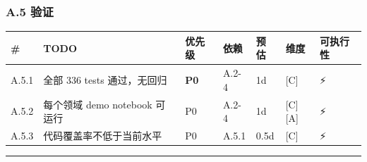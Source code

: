 \documentclass[
  12pt,
]{ctexart}
\begin{document}
\subsubsection{A.5 验证}\label{a.5-ux9a8cux8bc1}

\begin{longtable}[]{@{}
  >{\raggedright\arraybackslash}p{}
  >{\raggedright\arraybackslash}p{}
  >{\raggedright\arraybackslash}p{}
  >{\raggedright\arraybackslash}p{}
  >{\raggedright\arraybackslash}p{}
  >{\raggedright\arraybackslash}p{}
  >{\raggedright\arraybackslash}p{}@{}}
\toprule\noalign{}
\begin{minipage}[b]{\linewidth}\raggedright
\#
\end{minipage} & \begin{minipage}[b]{\linewidth}\raggedright
TODO
\end{minipage} & \begin{minipage}[b]{\linewidth}\raggedright
优先级
\end{minipage} & \begin{minipage}[b]{\linewidth}\raggedright
依赖
\end{minipage} & \begin{minipage}[b]{\linewidth}\raggedright
预估
\end{minipage} & \begin{minipage}[b]{\linewidth}\raggedright
维度
\end{minipage} & \begin{minipage}[b]{\linewidth}\raggedright
可执行性
\end{minipage} \\
\midrule\noalign{}
\endhead
\bottomrule\noalign{}
\endlastfoot
A.5.1 & 全部 336 tests 通过，无回归 & \textbf{P0} & A.2-4 & 1d & {[}C{]}
& ⚡ \\
A.5.2 & 每个领域 demo notebook 可运行 & P0 & A.2-4 & 1d & {[}C{]}{[}A{]}
& ⚡ \\
A.5.3 & 代码覆盖率不低于当前水平 & P0 & A.5.1 & 0.5d & {[}C{]} & ⚡ \\
\end{longtable}

\begin{center}\rule{0.5\linewidth}{0.5pt}\end{center}
\end{document}
